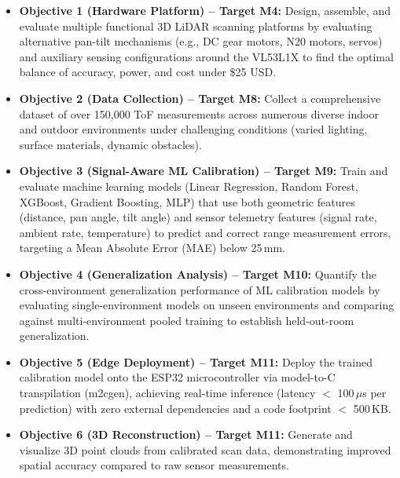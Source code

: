 \documentclass[12pt,a4paper]{article}
\begin{document}
    \begin{itemize}[leftmargin=0.35in]
        \item \textbf{Objective 1 (Hardware Platform) -- Target M4:} Design, assemble, and evaluate multiple functional 3D LiDAR scanning platforms by evaluating alternative pan-tilt mechanisms (e.g., DC gear motors, N20 motors, servos) and auxiliary sensing configurations around the VL53L1X to find the optimal balance of accuracy, power, and cost under \$25 USD.

        \item \textbf{Objective 2 (Data Collection) -- Target M8:} Collect a comprehensive dataset of over 150,000 ToF measurements across numerous diverse indoor and outdoor environments under challenging conditions (varied lighting, surface materials, dynamic obstacles).

        \item \textbf{Objective 3 (Signal-Aware ML Calibration) -- Target M9:} Train and evaluate machine learning models (Linear Regression, Random Forest, XGBoost, Gradient Boosting, MLP) that use both geometric features (distance, pan angle, tilt angle) and sensor telemetry features (signal rate, ambient rate, temperature) to predict and correct range measurement errors, targeting a Mean Absolute Error (MAE) below 25\,mm.

        \item \textbf{Objective 4 (Generalization Analysis) -- Target M10:} Quantify the cross-environment generalization performance of ML calibration models by evaluating single-environment models on unseen environments and comparing against multi-environment pooled training to establish held-out-room generalization.

        \item \textbf{Objective 5 (Edge Deployment) -- Target M11:} Deploy the trained calibration model onto the ESP32 microcontroller via model-to-C transpilation (m2cgen), achieving real-time inference (latency $<$ 100\,$\mu$s per prediction) with zero external dependencies and a code footprint $<$ 500\,KB.

        \item \textbf{Objective 6 (3D Reconstruction) -- Target M11:} Generate and visualize 3D point clouds from calibrated scan data, demonstrating improved spatial accuracy compared to raw sensor measurements.
    \end{itemize}


\end{document}
